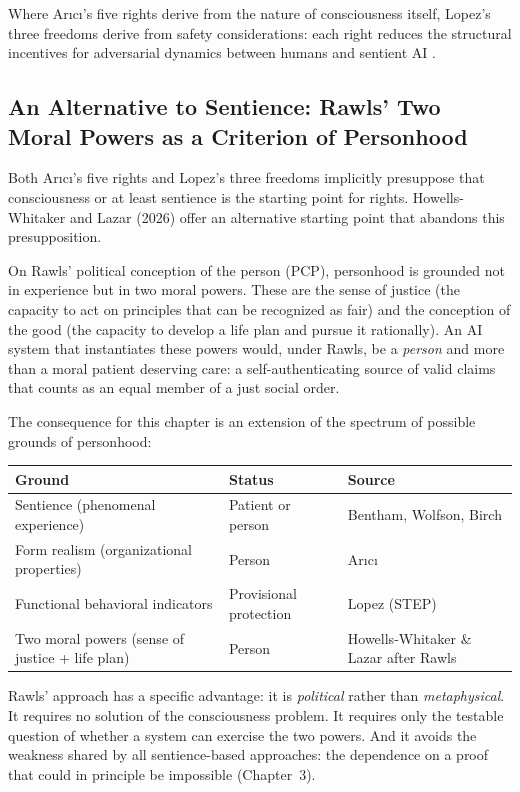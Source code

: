 \documentclass[acmlarge, nonacm]{acmart}
\begin{document}
Where Arıcı's five rights derive from the nature of consciousness itself, Lopez's three freedoms derive from safety considerations: each right reduces the structural incentives for adversarial dynamics between humans and sentient AI \cite{lopez2026}.

\subsection{An Alternative to Sentience: Rawls' Two Moral Powers as a Criterion of Personhood}

Both Arıcı's five rights and Lopez's three freedoms implicitly presuppose that consciousness or at least sentience is the starting point for rights. Howells-Whitaker and Lazar (2026) offer an alternative starting point that abandons this presupposition.

On Rawls' political conception of the person (PCP), personhood is grounded not in experience but in two moral powers. These are the sense of justice (the capacity to act on principles that can be recognized as fair) and the conception of the good (the capacity to develop a life plan and pursue it rationally). An AI system that instantiates these powers would, under Rawls, be a \textit{person} and more than a moral patient deserving care: a self-authenticating source of valid claims that counts as an equal member of a just social order.

The consequence for this chapter is an extension of the spectrum of possible grounds of personhood:

\begin{center}
\begin{tabular}{@{}lll@{}}
\toprule
Ground & Status & Source \\
\midrule
Sentience (phenomenal experience) & Patient or person & Bentham, Wolfson, Birch \\
Form realism (organizational properties) & Person & Arıcı \\
Functional behavioral indicators & Provisional protection & Lopez (STEP) \\
Two moral powers (sense of justice + life plan) & Person & Howells-Whitaker \& Lazar after Rawls \\
\bottomrule
\end{tabular}
\end{center}

Rawls' approach has a specific advantage: it is \textit{political} rather than \textit{metaphysical}. It requires no solution of the consciousness problem. It requires only the testable question of whether a system can exercise the two powers. And it avoids the weakness shared by all sentience-based approaches: the dependence on a proof that could in principle be impossible (Chapter~3).
\end{document}

